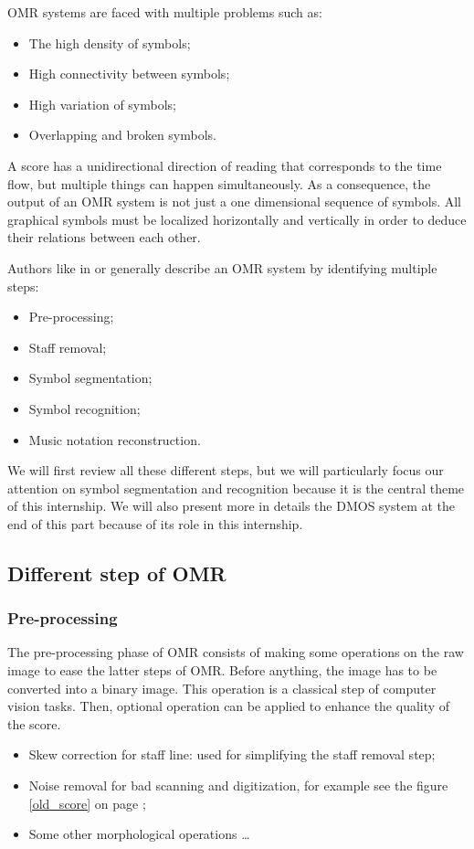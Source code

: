 \documentclass[11pt]{sdm}
\begin{document}
OMR systems are faced with multiple problems such as:
\begin{itemize}
  \item The high density of symbols;
  \item High connectivity between symbols;
  \item High variation of symbols;
  \item Overlapping and broken symbols.
\end{itemize}
A score has a unidirectional direction of reading that corresponds to the time flow, but multiple things can happen simultaneously.
As a consequence, the output of an OMR system is not just a one dimensional sequence of symbols.
All graphical symbols must be localized horizontally and vertically in order to deduce their relations between each other.

Authors like in \cite{rebelo_optical_2012} or \cite{fornes_analysis_2014} generally describe an OMR system by identifying multiple steps:
\begin{itemize}
  \item Pre-processing;
  \item Staff removal;
  \item Symbol segmentation;
  \item Symbol recognition;
  \item Music notation reconstruction.
\end{itemize}
We will first review all these different steps, but we will particularly focus our attention on symbol segmentation and recognition because it is the central theme of this internship.
We will also present more in details the DMOS system at the end of this part because of its role in this internship.

\subsection{Different step of OMR}

\subsubsection{Pre-processing}

The pre-processing phase of OMR consists of making some operations on the raw image to ease the latter steps of OMR.
Before anything, the image has to be converted into a binary image.
This operation is a classical step of computer vision tasks.
Then, optional operation can be applied to enhance the quality of the score.
\begin{itemize}
  \item Skew correction for staff line: used for simplifying the staff removal step;
  \item Noise removal for bad scanning and digitization, for example see the figure \ref{old_score} on page \pageref{old_score};
  \item Some other morphological operations \ldots
\end{itemize}
\end{document}
